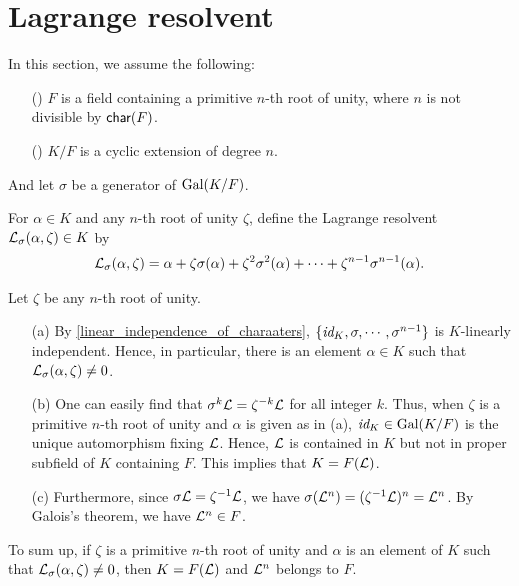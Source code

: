 \section{Lagrange resolvent}\label{Lagrange_resolvent}

In this section, we assume the following:
\begin{enumerate}
    \item[(\romannumeral 1)]
    {
        $F$ is a field containing a primitive $n$-th root of unity, where $n$ is not divisible by ${\textsf{char}({F})}$.
    }
    \item[(\romannumeral 2)]
    {
        $K/F$ is a cyclic extension of degree $n$.
    }
\end{enumerate}
And let $\sigma$ be a generator of ${\textrm{Gal}({K/F})}$.

\begin{defi}
    For $\alpha\in K$ and any $n$-th root of unity $\zeta$, define the Lagrange resolvent ${\mathcal{L}}_\sigma(\alpha, \zeta)\in K$ by
    \begin{align*}
        {\mathcal{L}}_\sigma(\alpha, \zeta)=\alpha+\zeta\sigma(\alpha)+\zeta^2\sigma^2(\alpha)+\cdots+\zeta^{n-1}\sigma^{n-1}(\alpha).
    \end{align*}
\end{defi}
\begin{obs}\label{the proof of cyclic->radical}
    Let $\zeta$ be any $n$-th root of unity.
    \begin{enumerate}
        \item[(a)]
        {
            By \cref{linear_independence_of_charaaters}, $\{\textit{id}_{K}, \sigma, \cdots, \sigma^{n-1}\}$ is $K$-linearly independent.
            Hence, in particular, there is an element $\alpha\in K$ such that ${\mathcal{L}}_\sigma(\alpha, \zeta)\neq 0$.
        }
        \item[(b)]
        {
            One can easily find that $\sigma^k{\mathcal{L}}=\zeta^{-k}{\mathcal{L}}$ for all integer $k$.
            Thus, when $\zeta$ is a primitive $n$-th root of unity and $\alpha$ is given as in (a), $\textit{id}_{K}\in{\textrm{Gal}({K/F})}$ is the unique automorphism fixing ${\mathcal{L}}$.
            Hence, ${\mathcal{L}}$ is contained in $K$ but not in proper subfield of $K$ containing $F$.
            This implies that $K=F({\mathcal{L}})$.
        }
        \item[(c)]
        {
            Furthermore, since $\sigma{\mathcal{L}}=\zeta^{-1}{\mathcal{L}}$, we have $\sigma({\mathcal{L}}^n)=(\zeta^{-1}{\mathcal{L}})^n={\mathcal{L}}^n$.
            By Galois's theorem, we have ${\mathcal{L}}^n\in F$.
        }
    \end{enumerate}
    To sum up, if $\zeta$ is a primitive $n$-th root of unity and $\alpha$ is an element of $K$ such that ${\mathcal{L}}_\sigma(\alpha, \zeta)\neq 0$, then $K=F({\mathcal{L}})$ and ${\mathcal{L}}^n$ belongs to $F$.
\end{obs}